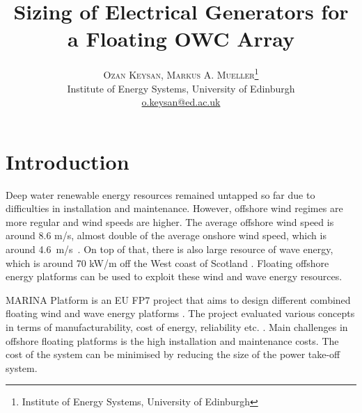 \documentclass[twocolumn]{article}
\title{\vspace{-15mm}\fontsize{24pt}{10pt}\selectfont\textbf{Sizing of Electrical Generators for a Floating OWC Array}} %
\author{
\large
\textsc{Ozan Keysan, Markus A. Mueller}\thanks{Institute of Energy Systems, University of Edinburgh}\\[2mm] %
\normalsize Institute of Energy Systems, University of Edinburgh \\ %
\normalsize \href{mailto:o.keysan@ed.ac.uk}{o.keysan@ed.ac.uk} %
\vspace{-5mm}
}
\date{}
\begin{document}

\section{Introduction}

Deep water renewable energy resources remained  untapped so far due to difficulties in installation and maintenance. However, offshore wind regimes are more regular and wind speeds are higher. The average offshore wind speed is around 8.6 m/s, almost double of the average onshore wind speed, which is around 4.6~m/s~\cite{Hau2013}. On top of that, there is also large resource of wave energy, which is around 70 kW/m off the West coast of Scotland \cite{BERR2008}. Floating offshore energy platforms can be used to exploit these wind and wave energy resources.

MARINA Platform is an EU FP7 project that aims to design different combined floating wind and wave energy platforms \cite{marinaweb}. The project evaluated various concepts in terms of manufacturability, cost of energy, reliability etc. \cite{Barrios2012}. Main challenges in offshore floating platforms is the high installation and maintenance costs. The cost of the system can be minimised by reducing the size of the power take-off system.
\end{document}
